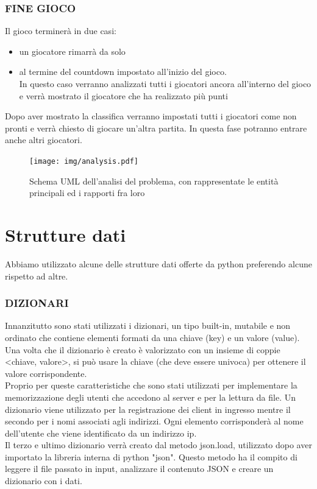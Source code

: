 \documentclass[a4paper,12pt]{report}
\begin{document}
\subsection{FINE GIOCO}
Il gioco terminerà in due casi:
\begin{itemize}
	\item un giocatore rimarrà da solo 
	\item al termine del countdown impostato all'inizio del gioco.\\ In questo caso verranno analizzati tutti i giocatori ancora all'interno del gioco e verrà mostrato il giocatore che ha realizzato più punti
\end{itemize}
Dopo aver mostrato la classifica verranno impostati tutti i giocatori come non pronti e verrà chiesto di giocare un'altra partita. In questa fase potranno entrare anche altri giocatori.

\begin{figure}[h]
\centering{}
\texttt{[image: img/analysis.pdf]}
\caption{Schema UML dell'analisi del problema, con rappresentate le entità principali ed i rapporti fra loro}
\label{img:analysis}
\end{figure}

\chapter{Strutture dati}
Abbiamo utilizzato alcune delle strutture dati offerte da python preferendo alcune rispetto ad altre.
\subsection{DIZIONARI}
Innanzitutto sono stati utilizzati i dizionari, un tipo built-in, mutabile e non ordinato che contiene elementi formati da una chiave (key) e un valore (value). Una volta che il dizionario è creato è valorizzato con un insieme di coppie <chiave, valore>, si può usare la chiave (che deve essere univoca) per ottenere il valore corrispondente. \\ Proprio per queste caratteristiche che sono stati utilizzati per implementare la memorizzazione degli utenti che accedono al server e per la lettura da file. Un dizionario viene utilizzato per la registrazione dei client in ingresso mentre il secondo per i nomi associati agli indirizzi. Ogni elemento corrisponderà al nome dell'utente che viene identificato da un indirizzo ip.\\
Il terzo e ultimo dizionario verrà creato dal metodo json.load, utilizzato dopo aver importato la libreria interna di python "json".
Questo metodo ha il compito di leggere il file passato in input, analizzare il contenuto JSON e creare un dizionario con i dati.
 
\end{document}
